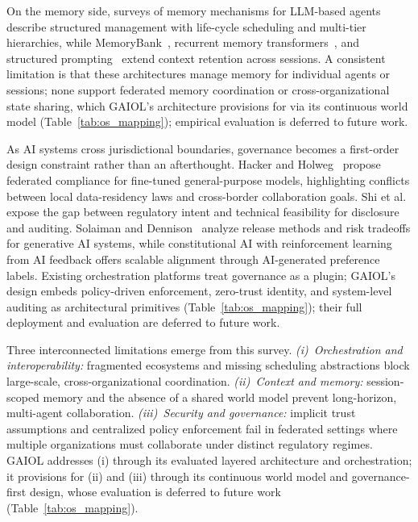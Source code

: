 \documentclass{iopjournal}
\begin{document}
On the memory side, surveys of memory mechanisms for LLM-based agents~\cite{MemoryOS} describe structured management with life-cycle scheduling and multi-tier hierarchies, while MemoryBank~\cite{MemoryBank_ACL23}, recurrent memory transformers~\cite{RecurrentMemory_NeurIPS23}, and structured prompting~\cite{LongContext_ICML24} extend context retention across sessions. A consistent limitation is that these architectures manage memory for individual agents or sessions; none support federated memory coordination or cross-organizational state sharing, which GAIOL's architecture provisions for via its continuous world model (Table~\ref{tab:os_mapping}); empirical evaluation is deferred to future work.

As AI systems cross jurisdictional boundaries, governance becomes a first-order design constraint rather than an afterthought. Hacker and Holweg~\cite{FineTuningReg} propose federated compliance for fine-tuned general-purpose models, highlighting conflicts between local data-residency laws and cross-border collaboration goals. Shi et al.~\cite{FM_Governance} expose the gap between regulatory intent and technical feasibility for disclosure and auditing. Solaiman and Dennison~\cite{SafetyTaxonomy_FAccT23} analyze release methods and risk tradeoffs for generative AI systems, while constitutional AI with reinforcement learning from AI feedback offers scalable alignment through AI-generated preference labels. Existing orchestration platforms treat governance as a plugin; GAIOL's design embeds policy-driven enforcement, zero-trust identity, and system-level auditing as architectural primitives (Table~\ref{tab:os_mapping}); their full deployment and evaluation are deferred to future work.

Three interconnected limitations emerge from this survey. \emph{(i)~Orchestration and interoperability:} fragmented ecosystems and missing scheduling abstractions block large-scale, cross-organizational coordination. \emph{(ii)~Context and memory:} session-scoped memory and the absence of a shared world model prevent long-horizon, multi-agent collaboration. \emph{(iii)~Security and governance:} implicit trust assumptions and centralized policy enforcement fail in federated settings where multiple organizations must collaborate under distinct regulatory regimes. GAIOL addresses (i) through its evaluated layered architecture and orchestration; it provisions for (ii) and (iii) through its continuous world model and governance-first design, whose evaluation is deferred to future work (Table~\ref{tab:os_mapping}).
\end{document}
